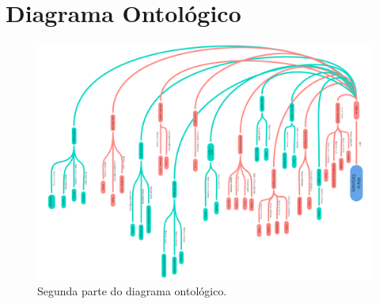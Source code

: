 \chapter{Diagrama Ontológico}
\label{sec-diag-ontol}


\begin{figure}
	\centering
	\includegraphics[width=23cm]{figuras/fig-diag-2} 
	\caption{Segunda parte do diagrama ontológico.}
	\label{fig-intro-diag2}
\end{figure}